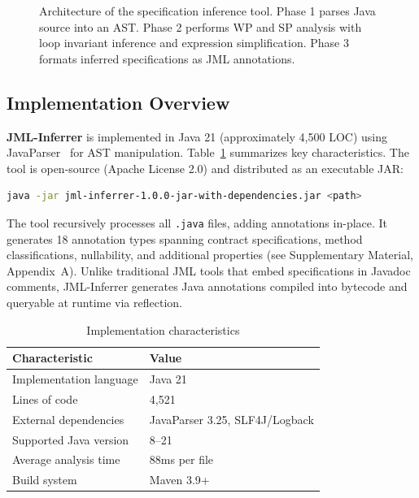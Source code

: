 \begin{figure}[t]
{%
}
\caption{Architecture of the specification inference tool. Phase 1 parses Java source into an AST. Phase 2 performs WP and SP analysis with loop invariant inference and expression simplification. Phase 3 formats inferred specifications as JML annotations.}
\label{fig:architecture}
\end{figure}

\subsection{Implementation Overview}

\textbf{JML-Inferrer} is implemented in Java 21 (approximately 4,500 LOC) using JavaParser~\cite{javaparser} for AST manipulation. Table~\ref{tab:implementation} summarizes key characteristics. The tool is open-source (Apache License 2.0) and distributed as an executable JAR:

\begin{lstlisting}[language=bash, basicstyle=\ttfamily\small]
java -jar jml-inferrer-1.0.0-jar-with-dependencies.jar <path>
\end{lstlisting}

The tool recursively processes all \texttt{.java} files, adding annotations in-place. It generates 18 annotation types spanning contract specifications, method classifications, nullability, and additional properties (see Supplementary Material, Appendix~A). Unlike traditional JML tools that embed specifications in Javadoc comments, JML-Inferrer generates Java annotations compiled into bytecode and queryable at runtime via reflection.

\begin{table}[ht]
\centering
\caption{Implementation characteristics}
\label{tab:implementation}
\begin{tabular}{ll}
\toprule
\textbf{Characteristic} & \textbf{Value} \\
\midrule
Implementation language & Java 21 \\
Lines of code & 4,521 \\
External dependencies & JavaParser 3.25, SLF4J/Logback \\
Supported Java version & 8--21 \\
Average analysis time & 88ms per file \\
Build system & Maven 3.9+ \\
\bottomrule
\end{tabular}
\end{table}

